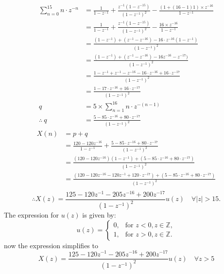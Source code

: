 \documentclass[journal,12pt,onecolumn]{IEEEtran}
\theoremstyle{remark}
\begin{document}
\[
\begin{aligned}
   \sum_{n=0}^{15}n\cdot z^{-n}&= \frac{1}{1 - z^{-1} }+ \frac{z^{-1}(1 - z^{-15})}{(1 - z^{-1})^2}-\frac{(1+(16-1)1)\times z^{-16}}{1-z^{-1}} \\
&=\frac{1}{1 - z^{-1} }+ \frac{z^{-1}(1 - z^{-15})}{(1 - z^{-1})^2}-\frac{16\times z^{-16}}{1-z^{-1}}\\
&=\frac{(1-z^{-1})+(z^{-1}-z^{-16})-16\cdot z^{-16}(1-z^{-1})}{(1-z^{-1})^{2}}\\
&=\frac{(1-z^{-1})+(z^{-1}-z^{-16})-16z^{-16}-z^{-17})}{(1-z^{-1})^{2}}\\
&=\frac{1-z^{-1}+z^{-1}-z^{-16}-16\cdot z^{-16}+16\cdot z^{-17}}{(1-z^{-1})^{2}}\\
&=\frac{1-17\cdot z^{-16}+16\cdot z^{-17}}{(1-z^{-1})^{2}}\\
q&=5\times \sum_{n=1}^{16}n\cdot z^{-(n-1)}\\
\therefore \ q&=\frac{5-85\cdot z^{-16}+80\cdot z^{-17}}{(1-z^{-1})^{2}}
\end{aligned}
\]
\[
\begin{aligned}
   X(n)&=p+q\\
   &=\frac{120 -120 z^{-16}}{1-z^{-1}}+\frac{5-85\cdot z^{-16}+80\cdot z^{-17}}{(1-z^{-1})^{2}}\\
   &=\frac{(120 -120 z^{-16})(1-z^{-1})+(5-85\cdot z^{-16}+80\cdot z^{-17})}{(1-z^{-1})^2}\\
   &=\frac{(120-120 z^{-16}-120 z^{-1}+120\cdot z^{-17})+(5-85\cdot z^{-16}+80\cdot z^{-17})}{(1-z^{-1})^2}\\
\end{aligned}
\]
\begin{equation}
\therefore X(z) = \frac{125 -120 z^{-1}-205 z^{-16}+200 z^{-17}}{(1-z^{-1})^2} u(z) \quad \forall \lvert z \rvert > 15.
\end{equation}
The expression for \( u(z) \) is given by:
\[
u(z) = 
\begin{cases}
    0, & \text{for } z < 0, z \in \mathbb{Z}, \\
    1, & \text{for } z > 0, z \in \mathbb{Z}.
\end{cases}
\]
now the expression simplifies to 
\begin {equation}
X(z) = \frac{125 -120 z^{-1}-205 z^{-16}+200 z^{-17}}{(1-z^{-1})^2} u(z) \quad \forall z>5
\end {equation}
\end{document}
